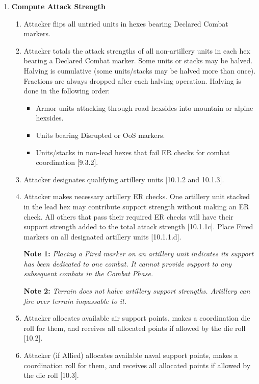 \begin{enumerate}[label=\textbf{\Roman*.}]
    \item \textbf{Compute Attack Strength}
    \begin{enumerate}[label=\alph*.]
        \item Attacker flips all untried units in hexes bearing Declared Combat markers.
        \item Attacker totals the attack strengths of all non-artillery units in each hex bearing a Declared Combat marker. Some units or stacks may be halved. Halving is cumulative (some units/stacks may be halved more than once). Fractions are always dropped after each halving operation. Halving is done in the following order:
        \begin{itemize}
            \item Armor units attacking through road hexsides into mountain or alpine hexsides.
            \item Units bearing Disrupted or OoS markers.
            \item Units/stacks in non-lead hexes that fail ER checks for combat coordination [9.3.2].
        \end{itemize}
        \item Attacker designates qualifying artillery units [10.1.2 and 10.1.3].
        \item Attacker makes necessary artillery ER checks. One artillery unit stacked in the lead hex may contribute support strength without making an ER check. All others that pass their required ER checks will have their support strength added to the total attack strength [10.1.1c]. Place Fired markers on all designated artillery units [10.1.1.d].
        
        \textbf{Note 1:} \textit{Placing a Fired marker on an artillery unit indicates its support has been dedicated to one combat. It cannot provide support to any subsequent combats in the Combat Phase.}
        
        \textbf{Note 2:} \textit{Terrain does not halve artillery support strengths. Artillery can fire over terrain impassable to it.}
        \item Attacker allocates available air support points, makes a coordination die roll for them, and receives all allocated points if allowed by the die roll [10.2].
        \item Attacker (if Allied) allocates available naval support points, makes a coordination roll for them, and receives all allocated points if allowed by the die roll [10.3].
        

\end{enumerate}
\end{enumerate}
